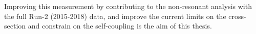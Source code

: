 Improving this measurement by contributing to the \HHyybb non-resonant analysis with the full Run-2 (2015-2018) data, and improve the current limits on the cross-section and constrain on the self-coupling is the aim of this thesis. 



